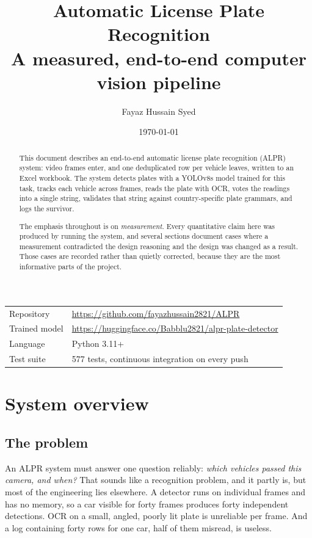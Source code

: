 \documentclass[11pt,a4paper]{article}
\title{\vspace{-1.5cm}\textbf{Automatic License Plate Recognition}\\[0.3em]
       \large A measured, end-to-end computer vision pipeline}
\author{Fayaz Hussain Syed}
\date{\today}
\begin{document}
\maketitle
\thispagestyle{empty}

\begin{abstract}
\noindent
This document describes an end-to-end automatic license plate recognition (ALPR)
system: video frames enter, and one deduplicated row per vehicle leaves, written
to an Excel workbook. The system detects plates with a YOLOv8s model trained for
this task, tracks each vehicle across frames, reads the plate with OCR, votes the
readings into a single string, validates that string against country-specific
plate grammars, and logs the survivor.

The emphasis throughout is on \emph{measurement}. Every quantitative claim here
was produced by running the system, and several sections document cases where a
measurement contradicted the design reasoning and the design was changed as a
result. Those cases are recorded rather than quietly corrected, because they are
the most informative parts of the project.
\end{abstract}

\vspace{0.5em}
\begin{center}
\small
\begin{tabular}{ll}
\toprule
Repository & \url{https://github.com/fayazhussain2821/ALPR} \\
Trained model & \url{https://huggingface.co/Babblu2821/alpr-plate-detector} \\
Language & Python 3.11+ \\
Test suite & 577 tests, continuous integration on every push \\
\bottomrule
\end{tabular}
\end{center}

\tableofcontents
\newpage

\section{System overview}

\subsection{The problem}

An ALPR system must answer one question reliably: \emph{which vehicles passed this
camera, and when?} That sounds like a recognition problem, and it partly is, but
most of the engineering lies elsewhere. A detector runs on individual frames and
has no memory, so a car visible for forty frames produces forty independent
detections. OCR on a small, angled, poorly lit plate is unreliable per frame.
And a log containing forty rows for one car, half of them misread, is useless.
\end{document}

